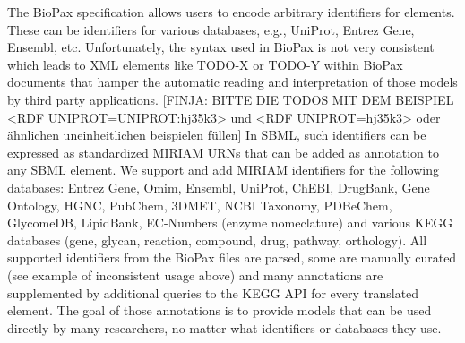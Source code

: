 \documentclass{bioinfo}
\begin{document}
\begin{methods}
The BioPax specification allows users to encode arbitrary identifiers for elements. These can be identifiers for various databases, e.g., UniProt, Entrez Gene, Ensembl, etc. Unfortunately, the syntax used in BioPax is not very consistent which leads to XML elements like TODO-X or TODO-Y within BioPax documents that hamper the automatic reading and interpretation of those models by third party applications. [FINJA: BITTE DIE TODOS MIT DEM BEISPIEL <RDF UNIPROT=UNIPROT:hj35k3> und <RDF UNIPROT=hj35k3> oder \"ahnlichen uneinheitlichen beispielen f\"ullen]
In SBML, such identifiers can be expressed as standardized MIRIAM URNs that can be added as annotation to any SBML element. We support and add MIRIAM identifiers for the following databases: Entrez Gene, Omim, Ensembl, UniProt, ChEBI, DrugBank, Gene Ontology, HGNC, PubChem, 3DMET, NCBI Taxonomy, PDBeChem, GlycomeDB, LipidBank, EC-Numbers (enzyme nomeclature) and various KEGG databases (gene, glycan, reaction, compound, drug, pathway, orthology).
All supported identifiers from the BioPax files are parsed, some are manually curated (see example of inconsistent usage above) and many annotations are supplemented by additional queries to the KEGG API for every translated element. The goal of those annotations is to provide models that can be used directly by many researchers, no matter what identifiers or databases they use.


\end{methods}
\end{document}
